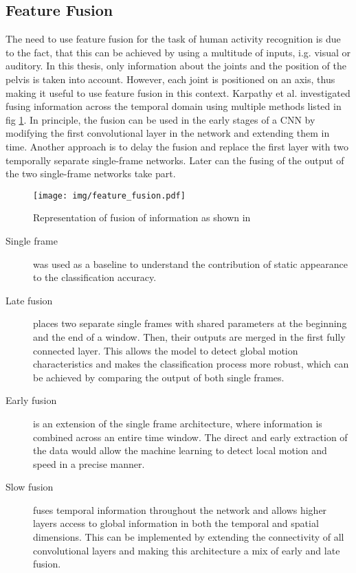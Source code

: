 \subsection{Feature Fusion}\label{subsec:feature-fusion}
The need to use feature fusion for the task of human activity recognition is due to the fact, that this can be achieved by using a multitude of inputs, i.g. visual or auditory. In this thesis, only information about the joints and the position of the pelvis is taken into account. However, each joint is positioned on an axis, thus making it useful to use feature fusion in this context. Karpathy et al. investigated fusing information across the temporal domain using multiple methods listed in fig \ref{fig:feature_fusion}. In principle, the fusion can be used in the early stages of a CNN by modifying the first convolutional layer in the network and extending them in time. Another approach is to delay the fusion and replace the first layer with two temporally separate single-frame networks. Later can the fusing of the output of the two single-frame networks take part\cite{karpathy2014large}.\newline
\begin{figure}[H]
	\begin{center}
		\texttt{[image: img/feature\_fusion.pdf]}
		\caption{Representation of fusion of information as shown in \cite{karpathy2014large}}
		\label{fig:feature_fusion}
	\end{center}
\end{figure}
\begin{description}
	\item[Single frame] was used as a baseline to understand the contribution of static appearance to the classification accuracy\cite{karpathy2014large}.
	\item[Late fusion] places two separate single frames with shared parameters at the beginning and the end of a window. Then, their outputs are merged in the first fully connected layer. This allows the model to detect global motion characteristics and makes the classification process more robust, which can be achieved by comparing the output of both single frames\cite{karpathy2014large}.
	\item[Early fusion] is an extension of the single frame architecture, where information is combined across an entire time window. The direct and early extraction of the data would allow the machine learning to detect local motion and speed in a precise manner\cite{karpathy2014large}.
	\item[Slow fusion] fuses temporal information throughout the network and allows higher layers access to global information in both the temporal and spatial dimensions. This can be implemented by extending the connectivity of all convolutional layers and making this architecture a mix of early and late fusion\cite{karpathy2014large}.
\end{description}
